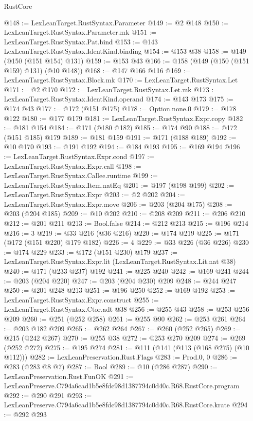 \begin{lexlean}{RustCore}
\begin{coremodule}
@148 := LexLeanTarget.RustSyntax.Parameter
@149 := @2 @148
@150 := LexLeanTarget.RustSyntax.Parameter.mk
@151 := LexLeanTarget.RustSyntax.Pat.bind
@153 := @143 LexLeanTarget.RustSyntax.IdentKind.binding
@154 := @153 @38
@158 := @149 (@150 (@151 @154) @131)
@159 := @153 @43
@166 := @158 (@149 (@150 (@151 @159) @131) (@10 @148))
@168 := @147 @166 @116
@169 := LexLeanTarget.RustSyntax.Block.mk
@170 := LexLeanTarget.RustSyntax.Let
@171 := @2 @170
@172 := LexLeanTarget.RustSyntax.Let.mk
@173 := LexLeanTarget.RustSyntax.IdentKind.operand
@174 := @143 @173
@175 := @174 @43
@177 := @172 (@151 @175)
@178 := Option.none.{0}
@179 := @178 @122
@180 := @177 @179
@181 := LexLeanTarget.RustSyntax.Expr.copy
@182 := @181 @154
@184 := @171 (@180 @182)
@185 := @174 @90
@188 := @172 (@151 @185) @179
@189 := @181 @159
@191 := @171 (@188 @189)
@192 := @10 @170
@193 := @191 @192
@194 := @184 @193
@195 := @169 @194
@196 := LexLeanTarget.RustSyntax.Expr.cond
@197 := LexLeanTarget.RustSyntax.Expr.call
@198 := LexLeanTarget.RustSyntax.Callee.runtime
@199 := LexLeanTarget.RustSyntax.Item.natEq
@201 := @197 (@198 @199)
@202 := LexLeanTarget.RustSyntax.Expr
@203 := @2 @202
@204 := LexLeanTarget.RustSyntax.Expr.move
@206 := @203 (@204 @175)
@208 := @203 (@204 @185)
@209 := @10 @202
@210 := @208 @209
@211 := @206 @210
@212 := @201 @211
@213 := Bool.false
@214 := @212 @213
@215 := @196 @214
@216 := 3
@219 := @33 @216 (@36 @216)
@220 := @174 @219
@225 := @171 (@172 (@151 @220) @179 @182)
@226 := 4
@229 := @33 @226 (@36 @226)
@230 := @174 @229
@233 := @172 (@151 @230) @179
@237 := LexLeanTarget.RustSyntax.Expr.lit (LexLeanTarget.RustSyntax.Lit.nat @38)
@240 := @171 (@233 @237) @192
@241 := @225 @240
@242 := @169 @241
@244 := @203 (@204 @220)
@247 := @203 (@204 @230) @209
@248 := @244 @247
@250 := @201 @248 @213
@251 := @196 @250
@252 := @169 @192
@253 := LexLeanTarget.RustSyntax.Expr.construct
@255 := LexLeanTarget.RustSyntax.Ctor.adt @38
@256 := @255 @43
@258 := @253 @256 @209
@260 := @251 (@252 @258)
@261 := @255 @90
@262 := @253 @261
@264 := @203 @182 @209
@265 := @262 @264
@267 := @260 (@252 @265)
@269 := @215 (@242 @267)
@270 := @255 @38
@272 := @253 @270 @209
@274 := @269 (@252 @272)
@275 := @195 @274
@281 := @111 (@141 (@113 (@168 @275) (@10 @112)))
@282 := LexLeanPreservation.Rust.Flags
@283 := Prod.{0, 0}
@286 := @283 (@283 @8 @7)
@287 := Bool
@289 := @10 (@286 @287)
@290 := LexLeanPreservation.Rust.FunOK
@291 := LexLeanPreserve.C794a6cad1b5e8fdc98d1387794c0d40c.R68.RustCore.program
@292 := @290 @291
@293 := LexLeanPreserve.C794a6cad1b5e8fdc98d1387794c0d40c.R68.RustCore.krate
@294 := @292 @293

\end{coremodule}
\end{lexlean}
